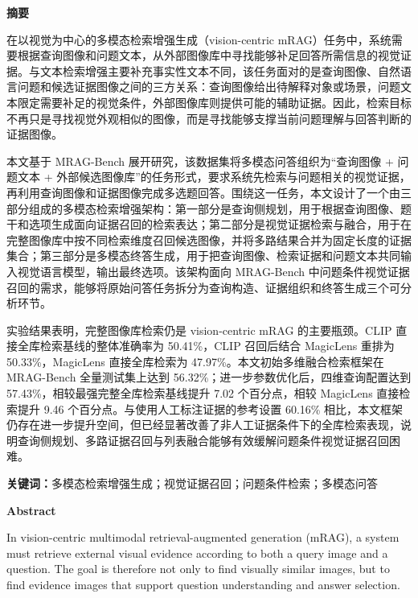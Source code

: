 \documentclass[12pt,openany]{report}
\begin{document}
\setcounter{tocdepth}{2}


\clearpage

\pagestyle{plain}

\begin{center}
{\bfseries 摘\quad 要\par}
\end{center}
\noindent\hspace*{\parindent}%
在以视觉为中心的多模态检索增强生成（vision-centric mRAG）任务中，系统需要根据查询图像和问题文本，从外部图像库中寻找能够补足回答所需信息的视觉证据。与文本检索增强主要补充事实性文本不同，该任务面对的是查询图像、自然语言问题和候选证据图像之间的三方关系：查询图像给出待解释对象或场景，问题文本限定需要补足的视觉条件，外部图像库则提供可能的辅助证据。因此，检索目标不再只是寻找视觉外观相似的图像，而是寻找能够支撑当前问题理解与回答判断的证据图像。

本文基于 MRAG-Bench 展开研究，该数据集将多模态问答组织为“查询图像 + 问题文本 + 外部候选图像库”的任务形式，要求系统先检索与问题相关的视觉证据，再利用查询图像和证据图像完成多选题回答。围绕这一任务，本文设计了一个由三部分组成的多模态检索增强架构：第一部分是查询侧规划，用于根据查询图像、题干和选项生成面向证据召回的检索表达；第二部分是视觉证据检索与融合，用于在完整图像库中按不同检索维度召回候选图像，并将多路结果合并为固定长度的证据集合；第三部分是多模态终答生成，用于把查询图像、检索证据和问题文本共同输入视觉语言模型，输出最终选项。该架构面向 MRAG-Bench 中问题条件视觉证据召回的需求，能够将原始问答任务拆分为查询构造、证据组织和终答生成三个可分析环节。

实验结果表明，完整图像库检索仍是 vision-centric mRAG 的主要瓶颈。CLIP 直接全库检索基线的整体准确率为 50.41\%，CLIP 召回后结合 MagicLens 重排为 50.33\%，MagicLens 直接全库检索为 47.97\%。本文初始多维融合检索框架在 MRAG-Bench 全量测试集上达到 56.32\%；进一步参数优化后，四维查询配置达到 57.43\%，相较最强完整全库检索基线提升 7.02 个百分点，相较 MagicLens 直接检索提升 9.46 个百分点。与使用人工标注证据的参考设置 60.16\% 相比，本文框架仍存在进一步提升空间，但已经显著改善了非人工证据条件下的全库检索表现，说明查询侧规划、多路证据召回与列表融合能够有效缓解问题条件视觉证据召回困难。

{\small\noindent\textbf{关键词：}多模态检索增强生成；视觉证据召回；问题条件检索；多模态问答\par}

\clearpage
\begin{center}
{\bfseries Abstract\par}
\end{center}
\noindent\hspace*{\parindent}In vision-centric multimodal retrieval-augmented generation (mRAG), a system must retrieve external visual evidence according to both a query image and a question. The goal is therefore not only to find visually similar images, but to find evidence images that support question understanding and answer selection.
\end{document}
